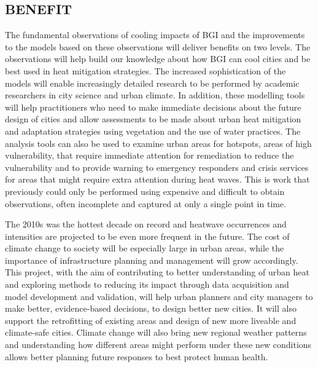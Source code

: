 \subsection*{\TitleFont BENEFIT}


The fundamental observations of cooling impacts of BGI and the improvements to the models based on these observations will deliver benefits on two levels. The observations will help build our knowledge about how BGI can cool cities and be best used in heat mitigation strategies. The increased sophistication of the models will enable increasingly detailed research to be performed by academic researchers in city science and urban climate. In addition, these modelling tools will help practitioners who need to make immediate decisions about the future design of cities and allow assessments to be made about urban heat mitigation and adaptation strategies using vegetation and the use of water practices. The analysis tools can also be used to examine urban areas for hotspots, areas of high vulnerability, that require immediate attention for remediation to reduce the vulnerability and to provide warning to emergency responders and crisis services for areas that might require extra attention during heat waves. This is work that previously could only be performed using expensive and difficult to obtain observations, often incomplete and captured at only a single point in time.

The 2010s was the hottest decade on record and heatwave occurrences and intensities are projected to be even more frequent in the future. The cost of climate change to society will be especially large in urban areas, while the importance of infrastructure planning and management will grow accordingly. This project, with the aim of contributing to better understanding of urban heat and exploring methods to reducing its impact through data acquisition and model development and validation, will help urban planners and city managers to make better, evidence-based decisions, to design better new cities. It will also support the retrofitting of existing areas and design of new more liveable and climate-safe cities. Climate change will also bring new regional weather patterns and understanding how different areas might perform under these new conditions allows better planning future responses to best protect human health.


